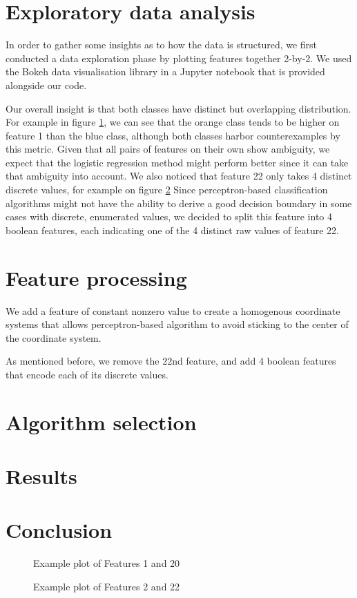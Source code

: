 \documentclass[10pt,conference,compsocconf]{IEEEtran}
\begin{document}
\section{Exploratory data analysis}
In order to gather some insights as to how the data is structured, we first conducted a data exploration phase by plotting features together 2-by-2.
We used the Bokeh data visualisation library in a Jupyter notebook that is provided alongside our code.

Our overall insight is that both classes have distinct but overlapping distribution. For example in figure \ref{f1-f20}, we can see that the orange class tends to be higher on feature 1 than the blue class, although both classes harbor counterexamples by this metric. Given that all pairs of features on their own show ambiguity, we expect that the logistic regression method might perform better since it can take that ambiguity into account. We also noticed that feature 22 only takes 4 distinct discrete values, for example on figure \ref{f2-f22} Since perceptron-based classification algorithms might not have the ability to derive a good decision boundary in some cases with discrete, enumerated values, we decided to split this feature into 4 boolean features, each indicating one of the 4 distinct raw values of feature 22.

\section{Feature processing}
We add a feature of constant nonzero value to create a homogenous coordinate systems that allows perceptron-based algorithm to avoid sticking to the center of the coordinate system.

As mentioned before, we remove the 22nd feature, and add 4 boolean features that encode each of its discrete values.
\section{Algorithm selection}
\section{Results}
\section{Conclusion}

\begin{figure}
	\caption{Example plot of Features 1 and 20}
	\label{f1-f20}
\end{figure}

\begin{figure}
	\caption{Example plot of Features 2 and 22}
	\label{f2-f22}
\end{figure}



\end{document}
